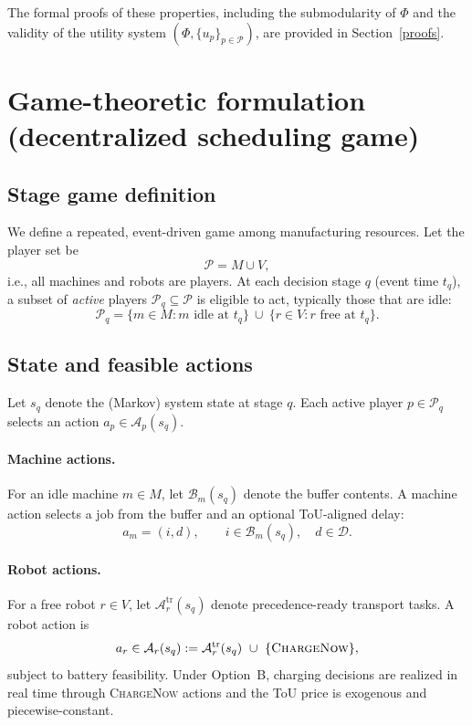 \documentclass[preprint, 3p, review, 12pt]{elsarticle}
\begin{document}
The formal proofs of these properties, including the submodularity of $\Phi$ and the validity of the utility system $(\Phi,\{u_p\}_{p \in \mathcal{P}})$, are provided in Section~\ref{proofs}.


\section{Game-theoretic formulation (decentralized scheduling game)}
\label{sec:game}

\subsection{Stage game definition}
We define a repeated, event-driven game among manufacturing resources.
Let the player set be
\[
\mathcal{P} = M \cup V,
\]
i.e., all machines and robots are players. At each decision stage $q$ (event time $t_q$),
a subset of \emph{active} players $\mathcal{P}_q\subseteq \mathcal{P}$ is eligible to act, typically those that are idle:
\[
\mathcal{P}_q=\{m\in M:\text{$m$ idle at $t_q$}\}\ \cup\ \{r\in V:\text{$r$ free at $t_q$}\}.
\]

\subsection{State and feasible actions}
Let $s_q$ denote the (Markov) system state at stage $q$.
Each active player $p\in\mathcal{P}_q$ selects an action $a_p \in \mathcal{A}_p(s_q)$.

\paragraph{Machine actions.}
For an idle machine $m\in M$, let $\mathcal{B}_m(s_q)$ denote the buffer contents.
A machine action selects a job from the buffer and an optional ToU-aligned delay:
\[
a_m=(i,d),\qquad i\in\mathcal{B}_m(s_q),\quad d\in\mathcal{D}.
\]

\paragraph{Robot actions.}
For a free robot $r\in V$, let $\mathcal{A}^{\mathrm{tr}}_r(s_q)$ denote precedence-ready transport tasks.
A robot action is
\[
a_r \in \mathcal{A}_r(s_q) := \mathcal{A}^{\mathrm{tr}}_r(s_q)\ \cup\ \{\textsc{ChargeNow}\},
\]
subject to battery feasibility. Under Option~B, charging decisions are realized in real time through \textsc{ChargeNow} actions
and the ToU price is exogenous and piecewise-constant.
\end{document}
